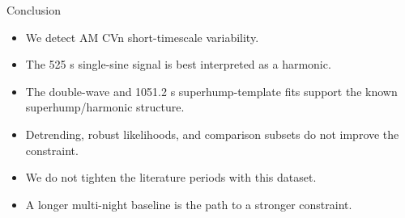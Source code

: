 \documentclass[aspectratio=169]{beamer}
\begin{document}
\begin{frame}{Conclusion}
  \begin{itemize}
    \item We detect AM CVn short-timescale variability.
    \item The 525 s single-sine signal is best interpreted as a harmonic.
    \item The double-wave and 1051.2 s superhump-template fits support the known superhump/harmonic structure.
    \item Detrending, robust likelihoods, and comparison subsets do not improve the constraint.
    \item We do not tighten the literature periods with this dataset.
    \item A longer multi-night baseline is the path to a stronger constraint.
  \end{itemize}
\end{frame}
\end{document}
